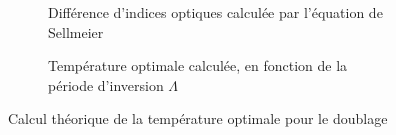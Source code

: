 \documentclass[11pt,a4paper]{article}
\newcommand{\ncite}[1]{[\citenum{#1}]}
\begin{document}
\begin{figure}[htpb] 
\centering
\hspace*{-0.8cm}
\begin{subfigure}[b]{0.48\textwidth}
	\centering
	
	\vspace{-0.5cm}
	\caption{Différence d'indices optiques calculée par l'équation de Sellmeier}
	\label{fig:sellmeier}
\end{subfigure}
\centering
\hspace*{0.8cm}
\begin{subfigure}[b]{0.48\textwidth}
	
	\vspace{-0.5cm}
	\caption{Température optimale calculée, en fonction de la période d'inversion $\Lambda$}
    \label{fig:lp}
\end{subfigure}
\caption{Calcul théorique de la température optimale pour le doublage}
\end{figure}


\end{document}
